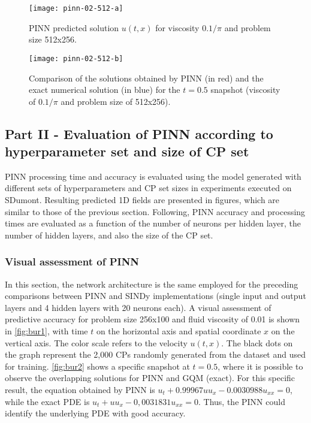 \documentclass[conference]{IEEEtran}
\begin{document}
\begin{figure}[htb]\centering
\texttt{[image: pinn-02-512-a]}
\caption{PINN predicted solution $u(t, x)$ for viscosity ${0.1}/{\pi}$ and problem size 512x256.}
\label{fig:pinn-02-512-a}
\end{figure}

\begin{figure}[htb]\centering
\texttt{[image: pinn-02-512-b]}
\caption{Comparison of the solutions obtained by PINN (in red) and the exact numerical solution (in blue) for the $t=0.5$ snapshot (viscosity of ${0.1}/{\pi}$ and problem size of 512x256).}
\label{fig:pinn-02-512-b}
\end{figure}


\subsection{Part II - Evaluation of PINN according to hyperparameter set and size of CP set}

PINN processing time and accuracy is evaluated using the model generated with different sets of hyperparameters and CP set sizes in experiments executed on SDumont. Resulting predicted 1D fields are presented in figures, which are similar to those of the previous section.
Following, PINN accuracy and processing times are evaluated as a function of the number of neurons per hidden layer, the number of hidden layers, and also the size of the CP set.

\subsubsection{Visual assessment of PINN}

In this section, the network architecture is the same employed for the preceding comparisons between PINN and SINDy implementations (single input and output layers and 4 hidden layers with 20 neurons each).
A visual assessment of predictive accuracy for problem size 256x100 and fluid viscosity of 0.01 is shown in \autoref{fig:bur1}, with time $t$ on the horizontal axis and spatial coordinate $x$ on the vertical axis. The color scale refers to the velocity $u(t, x)$. The black dots on the graph represent the 2,000 CPs randomly generated from the dataset and used for training.  \autoref {fig:bur2} shows a specific snapshot at $t=0.5$, where it is possible to observe the overlapping solutions for PINN and GQM (exact).  For this specific result, the equation obtained by PINN is $u_t + 0.99967 u u_x - 0.0030988 u_{xx} = 0$, while the exact PDE is $u_t + u u_x - 0 ,0031831 u_{xx} = 0$. Thus, the PINN could identify the underlying PDE with good accuracy.
\end{document}
